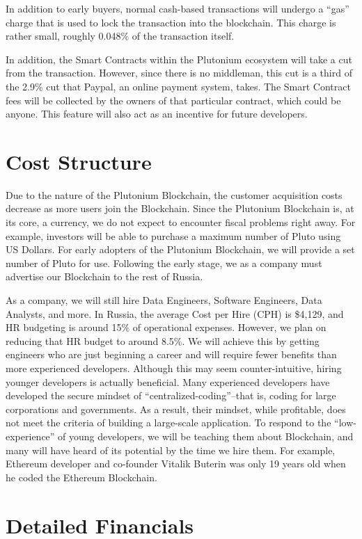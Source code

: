 \documentclass[12pt]{article}
\begin{document}
In addition to early buyers, normal cash-based transactions will undergo a ``gas'' charge that is used to lock the transaction into the blockchain. This charge is rather small, roughly 0.048\% of the transaction itself.

In addition, the Smart Contracts within the Plutonium ecosystem will take a cut from the transaction. However, since there is no middleman, this cut is a third of the 2.9\% cut that Paypal, an online payment system, takes. The Smart Contract fees will be collected by the owners of that particular contract, which could be anyone. This feature will also act as an incentive for future developers.
\pagebreak
\section{Cost Structure}
Due to the nature of the Plutonium Blockchain, the customer acquisition costs decrease as more users join the Blockchain. Since the Plutonium Blockchain is, at its core, a currency, we do not expect to encounter fiscal problems right away. For example, investors will be able to purchase a maximum number of Pluto using US Dollars. For early adopters of the Plutonium Blockchain, we will provide a set number of Pluto for use. Following the early stage, we as a company must advertise our Blockchain to the rest of Russia.

As a company, we will still hire Data Engineers, Software Engineers, Data Analysts, and more. In Russia, the average Cost per Hire (CPH) is \$4,129, and HR budgeting is around 15\% of operational expenses. However, we plan on reducing that HR budget to around 8.5\%. We will achieve this by getting engineers who are just beginning a career and will require fewer benefits than more experienced developers. Although this may seem counter-intuitive, hiring younger developers is actually beneficial. Many experienced developers have developed the secure mindset of ``centralized-coding''--that is, coding for large corporations and governments. As a result, their mindset, while profitable, does not meet the criteria of building a large-scale application. To respond to the ``low-experience'' of young developers, we will be teaching them about Blockchain, and many will have heard of its potential by the time we hire them. For example, Ethereum developer and co-founder Vitalik Buterin was only 19 years old when he coded the Ethereum Blockchain.
\pagebreak
\section{Detailed Financials}
\end{document}
